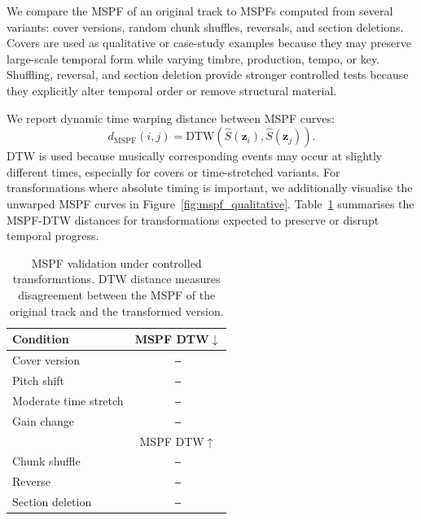 \documentclass{article}
\newcommand{\zseq}{\mathbf{z}}          %
\newcommand{\muspf}{\hat{S}}            %
\newcommand{\res}{\texttt{--}}
\begin{document}
We compare the MSPF of an original track to MSPFs computed from
several variants: cover versions, random chunk shuffles, reversals,
and section deletions.  Covers are used as qualitative or
case-study examples because they may preserve large-scale temporal
form while varying timbre, production, tempo, or key.  Shuffling,
reversal, and section deletion provide stronger controlled tests
because they explicitly alter temporal order or remove structural
material.

We report dynamic time warping distance between MSPF curves:
%
\begin{equation}
  d_{\mathrm{MSPF}}(i,j)
  =
  \mathrm{DTW}
  \left(
    \muspf(\zseq_i), \muspf(\zseq_j)
  \right).
  \label{eq:mspf_dtw}
\end{equation}
%
DTW is used because musically corresponding events may occur at
slightly different times, especially for covers or time-stretched
variants.  For transformations where absolute timing is important,
we additionally visualise the unwarped MSPF curves in
Figure~\ref{fig:mspf_qualitative}.  Table~\ref{tab:mspf_validation}
summarises the MSPF-DTW distances for transformations expected to
preserve or disrupt temporal progress.

\begin{table}[t]
  \centering
  \setlength{\tabcolsep}{5.2pt}
  \caption{MSPF validation under controlled transformations.  DTW
    distance measures disagreement between the MSPF of the original
  track and the transformed version.}
  \label{tab:mspf_validation}
  \begin{tabular}{lc}
    \toprule
    \textbf{Condition}
    & MSPF DTW$\downarrow$ \\
    \midrule
    Cover version & \res \\
    Pitch shift & \res \\
    Moderate time stretch & \res \\
    Gain change & \res \\
    \midrule
    & MSPF DTW$\uparrow$ \\
    \midrule
    Chunk shuffle & \res \\
    Reverse & \res \\
    Section deletion & \res \\
    \bottomrule
  \end{tabular}
\end{table}
\end{document}
